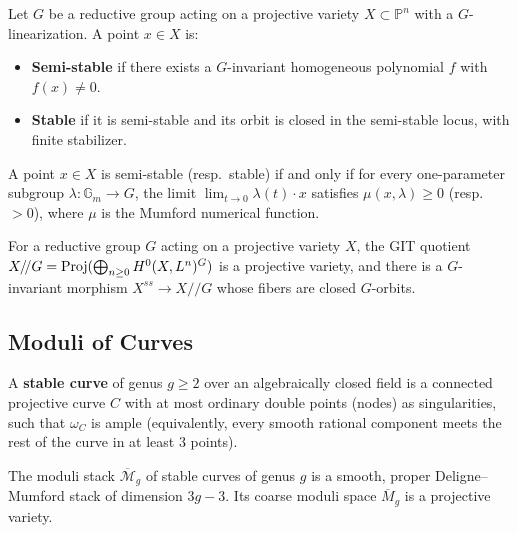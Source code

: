 \begin{definition}
Let $G$ be a reductive group acting on a projective variety $X \subset \mathbb{P}^n$ with a $G$-linearization. A point $x \in X$ is:
\begin{itemize}
    \item \textbf{Semi-stable} if there exists a $G$-invariant homogeneous polynomial $f$ with $f(x) \neq 0$.
    \item \textbf{Stable} if it is semi-stable and its orbit is closed in the semi-stable locus, with finite stabilizer.
\end{itemize}
\end{definition}

\begin{theorem}
A point $x \in X$ is semi-stable (resp.\ stable) if and only if for every one-parameter subgroup $\lambda: \mathbb{G}_m \to G$, the limit $\lim_{t \to 0} \lambda(t) \cdot x$ satisfies $\mu(x, \lambda) \geq 0$ (resp.\ $> 0$), where $\mu$ is the Mumford numerical function.
\end{theorem}

\begin{theorem}
For a reductive group $G$ acting on a projective variety $X$, the GIT quotient $X/\!/G = \operatorname{Proj}(\bigoplus_{n \geq 0} H^0(X, L^n)^G)$ is a projective variety, and there is a $G$-invariant morphism $X^{ss} \to X/\!/G$ whose fibers are closed $G$-orbits.
\end{theorem}

\subsection{Moduli of Curves}

\begin{definition}
A \textbf{stable curve} of genus $g \geq 2$ over an algebraically closed field is a connected projective curve $C$ with at most ordinary double points (nodes) as singularities, such that $\omega_C$ is ample (equivalently, every smooth rational component meets the rest of the curve in at least $3$ points).
\end{definition}

\begin{theorem}
The moduli stack $\overline{\mathcal{M}}_g$ of stable curves of genus $g$ is a smooth, proper Deligne--Mumford stack of dimension $3g-3$. Its coarse moduli space $\overline{M}_g$ is a projective variety.
\end{theorem}

